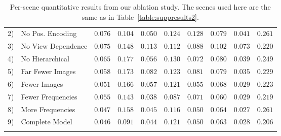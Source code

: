 \documentclass[runningheads]{llncs}
\newcommand{\mbf}[1]{{\mathbf{#1}}}
\begin{document}
\begin{table}[t]
{\begin{tabular}{ll|cccccccc}
2) & No Pos. Encoding          &      $0.076$  &      $0.104$  &      $0.050$  &      $0.124$  &      $0.128$  &      $0.079$  &      $0.041$  &      $0.261$  \\
3) & No View Dependence        &      $0.075$  &      $0.148$  &      $0.113$  &      $0.112$  &      $0.088$  &      $0.102$  &      $0.073$  &      $0.220$  \\
4) & No Hierarchical           &      $0.065$  &      $0.177$  &      $0.056$  &      $0.130$  &      $0.072$  &      $0.080$  &      $0.039$  &      $0.249$  \\
\arrayrulecolor{gray}
\hline
\arrayrulecolor{black}
5) & Far Fewer Images          &      $0.058$  &      $0.173$  &      $0.082$  &      $0.123$  &      $0.081$  &      $0.079$  &      $0.035$  &      $0.229$  \\
6) & Fewer Images              &      $0.051$  &      $0.166$  &      $0.057$  &      $0.121$  &      $0.055$  &      $0.068$  &      $0.029$  &      $0.223$  \\
\arrayrulecolor{gray}
\hline
\arrayrulecolor{black}
7) & Fewer Frequencies         &      $0.055$  &      $0.143$  & $\mbf{0.038}$ & $\mbf{0.087}$ &      $0.071$  & $\mbf{0.060}$ &      $0.029$  &      $0.219$  \\
8) & More Frequencies          &      $0.047$  &      $0.158$  &      $0.045$  &      $0.116$  &      $0.050$  &      $0.064$  & $\mbf{0.027}$ &      $0.261$  \\
\arrayrulecolor{gray}
\hline
\arrayrulecolor{black}
9) & Complete Model            & $\mbf{0.046}$ & $\mbf{0.091}$ &      $0.044$  &      $0.121$  & $\mbf{0.050}$ &      $0.063$  &      $0.028$  & $\mbf{0.206}$  \\
\hline
\multicolumn{9}{c}{}
\end{tabular}
} \vspace{2mm}
\caption{Per-scene quantitative results from our ablation study. The scenes used here are the same as in Table~\ref{table:suppresults2}.
}
\label{table:suppresultsabl} 
\end{table}
\setlength{\tabcolsep}{1.4pt} 
\end{document}
